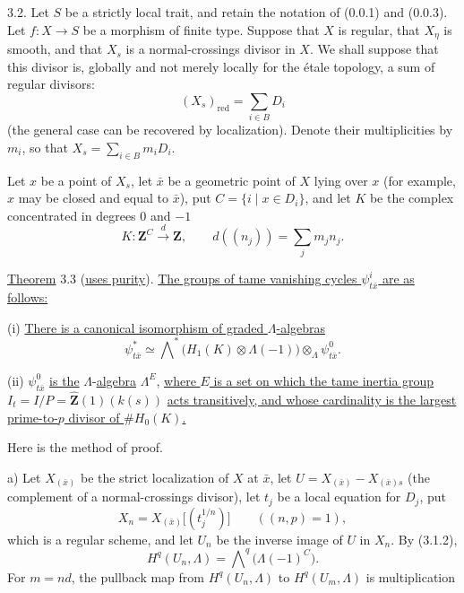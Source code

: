 3.2. Let $S$ be a strictly local trait, and retain the notation of
(0.0.1) and (0.0.3). Let $f:X\longrightarrow S$ be a morphism of finite
type. Suppose that $X$ is regular, that $X_\eta$ is smooth, and that
$X_s$ is a normal-crossings divisor in $X$. We shall suppose that this
divisor is, globally and not merely locally for the \'{e}tale topology, a
sum of regular divisors:
\[
(X_s)_{\mathrm{red}}=\sum_{i\in B}D_i
\]
(the general case can be recovered by localization). Denote their
multiplicities by $m_i$, so that
$X_s=\sum_{i\in B}m_iD_i$.

Let $x$ be a point of $X_s$, let $\bar x$ be a geometric point of $X$
lying over $x$ (for example, $x$ may be closed and equal to $\bar x$),
put $C=\{i\mid x\in D_i\}$, and let $K$ be the complex concentrated in
degrees $0$ and $-1$
\begin{equation*}
K:\mathbf Z^C\xrightarrow{\ d\ }\mathbf Z,
\qquad d((n_j))=\sum_jm_jn_j.
\end{equation*}

\underline{Theorem} 3.3 (\underline{uses purity}). \underline{The groups
of tame vanishing cycles $\psi^i_{t\bar x}$ are as follows:}

(i) \underline{There is a canonical isomorphism of graded
$\Lambda$-algebras}
\begin{equation*}
\psi^*_{t\bar x}\simeq
\bigwedge\nolimits^*\bigl(H_1(K)\otimes\Lambda(-1)\bigr)
\otimes_\Lambda\psi^0_{t\bar x}.
\end{equation*}

(ii) $\psi^0_{t\bar x}$ \underline{is the} $\Lambda$-\underline{algebra}
$\Lambda^E$, \underline{where $E$ is a set on which the tame inertia
group} $I_t=I/P=\widehat{\mathbf Z}(1)(k(s))$
\underline{acts transitively, and whose cardinality is the largest
prime-to-$p$ divisor of $\#H_0(K)$.}

Here is the method of proof.

a) Let $X_{(\bar x)}$ be the strict localization of $X$ at $\bar x$,
let $U=X_{(\bar x)}-X_{(\bar x)s}$ (the complement of a
normal-crossings divisor), let $t_j$ be a local equation for $D_j$, put
\[
X_n=X_{(\bar x)}\bigl[(t_j^{1/n})\bigr]
\qquad ((n,p)=1),
\]
which is a regular scheme, and let $U_n$ be the inverse image of $U$ in
$X_n$. By (3.1.2),
\[
H^q(U_n,\Lambda)=\bigwedge\nolimits^q\bigl(\Lambda(-1)^C\bigr).
\]
For $m=nd$, the pullback map from $H^q(U_n,\Lambda)$ to
$H^q(U_m,\Lambda)$ is multiplication


